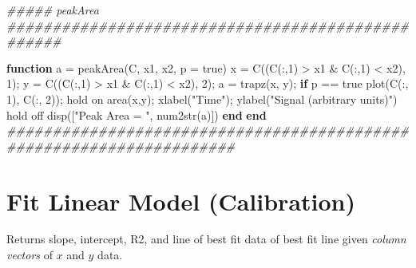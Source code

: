 \documentclass[]{tufte-book}
\newenvironment{Shaded}{}{}
\newcommand{\CommentTok}[1]{\textcolor[rgb]{0.38,0.63,0.69}{\textit{#1}}}
\newcommand{\ControlFlowTok}[1]{\textcolor[rgb]{0.00,0.44,0.13}{\textbf{#1}}}
\newcommand{\FloatTok}[1]{\textcolor[rgb]{0.25,0.63,0.44}{#1}}
\newcommand{\FunctionTok}[1]{\textcolor[rgb]{0.02,0.16,0.49}{#1}}
\newcommand{\NormalTok}[1]{#1}
\newcommand{\OperatorTok}[1]{\textcolor[rgb]{0.40,0.40,0.40}{#1}}
\newcommand{\StringTok}[1]{\textcolor[rgb]{0.25,0.44,0.63}{#1}}
\begin{document}
\begin{Shaded}
\begin{Highlighting}[]
\CommentTok{#####   peakArea   ##################################################}

\ControlFlowTok{function}\NormalTok{ a }\OperatorTok{=}\NormalTok{ peakArea(C}\OperatorTok{,}\NormalTok{ x1}\OperatorTok{,}\NormalTok{ x2}\OperatorTok{,}\NormalTok{ p }\OperatorTok{=} \FunctionTok{true}\NormalTok{)}
\NormalTok{    x }\OperatorTok{=}\NormalTok{ C((C(}\OperatorTok{:,}\FloatTok{1}\NormalTok{) }\OperatorTok{>}\NormalTok{ x1 }\OperatorTok{&}\NormalTok{ C(}\OperatorTok{:,}\FloatTok{1}\NormalTok{) }\OperatorTok{<}\NormalTok{ x2)}\OperatorTok{,} \FloatTok{1}\NormalTok{)}\OperatorTok{;}
\NormalTok{    y }\OperatorTok{=}\NormalTok{ C((C(}\OperatorTok{:,}\FloatTok{1}\NormalTok{) }\OperatorTok{>}\NormalTok{ x1 }\OperatorTok{&}\NormalTok{ C(}\OperatorTok{:,}\FloatTok{1}\NormalTok{) }\OperatorTok{<}\NormalTok{ x2)}\OperatorTok{,} \FloatTok{2}\NormalTok{)}\OperatorTok{;}
\NormalTok{    a }\OperatorTok{=} \FunctionTok{trapz}\NormalTok{(x}\OperatorTok{,}\NormalTok{ y)}\OperatorTok{;}
    \ControlFlowTok{if}\NormalTok{ p }\OperatorTok{==} \FunctionTok{true}
        \FunctionTok{plot}\NormalTok{(C(}\OperatorTok{:,} \FloatTok{1}\NormalTok{)}\OperatorTok{,}\NormalTok{ C(}\OperatorTok{:,} \FloatTok{2}\NormalTok{))}\OperatorTok{;}
        \FunctionTok{hold}\NormalTok{ on}
        \FunctionTok{area}\NormalTok{(x}\OperatorTok{,}\NormalTok{y)}\OperatorTok{;}
        \FunctionTok{xlabel}\NormalTok{(}\StringTok{"Time"}\NormalTok{)}\OperatorTok{;}
        \FunctionTok{ylabel}\NormalTok{(}\StringTok{"Signal (arbitrary units)"}\NormalTok{)}
        \FunctionTok{hold}\NormalTok{ off}
        \FunctionTok{disp}\NormalTok{([}\StringTok{"Peak Area = "}\OperatorTok{,} \FunctionTok{num2str}\NormalTok{(a)])}
    \ControlFlowTok{end}
\ControlFlowTok{end}
\CommentTok{#####################################################################}
\end{Highlighting}
\end{Shaded}

\hypertarget{fit-linear-model-calibration}{%
\section*{Fit Linear Model (Calibration)}\label{fit-linear-model-calibration}}

Returns slope, intercept, R2, and line of best fit data of best fit line given \emph{column vectors} of \(x\) and \(y\) data.
\end{document}
